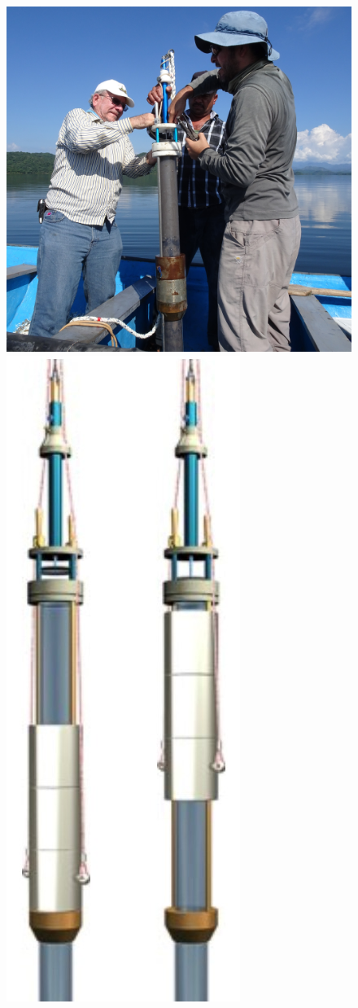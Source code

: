 \begin{figure}[h]
\centering
  \includegraphics[height = 0.35\textheight]{Imagenes/DSC01875-CUADRADA.JPG}
  \includegraphics[height = 0.35\textheight]{Imagenes/IMG_2280.jpg}

\end{figure}

